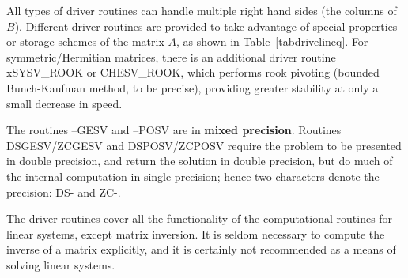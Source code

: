 All types of driver routines can handle multiple right hand sides
(the columns of $B$).
Different driver routines are provided to take advantage of special
properties or storage schemes of the matrix $A$, as shown in
Table~\ref{tabdrivelineq}.
For symmetric/Hermitian matrices, there is an additional driver routine
xSYSV\_ROOK or
CHESV\_ROOK,
which performs rook pivoting (bounded Bunch-Kaufman method, to be precise), 
providing greater stability at only a small decrease in speed.

The routines --GESV and --POSV are in
{\bf mixed precision}. Routines 
DSGESV/ZCGESV and 
DSPOSV/ZCPOSV
require the problem to be presented in double precision, and return the solution
in double precision, but do much of the internal computation in single precision;
hence two characters denote the precision: DS- and ZC-.

The driver routines cover all the functionality of the computational
routines for linear systems, except matrix
inversion. It is seldom
necessary to compute the inverse of a matrix explicitly, and it is
certainly not recommended as a means of solving linear systems.

